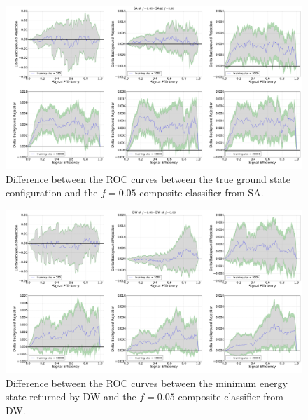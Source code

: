 \begin{figure}[h]
\begin{adjustbox}{center}
\includegraphics[width=\paperwidth]{SA--SA_L5}
\end{adjustbox}
\caption{Difference between the ROC curves between the true ground state configuration and the $f=0.05$ composite classifier from SA.}
\label{fig:SA_GS_SA_L3_droc}
\end{figure}
\clearpage
\begin{figure}[h]
\begin{adjustbox}{center}
\includegraphics[width=\paperwidth]{DW--DW_L5}
\end{adjustbox}
\caption{Difference between the ROC curves between the minimum energy state returned by DW and the $f=0.05$ composite classifier from DW.}
\label{fig:DW_GS_DW_L3_droc}
\end{figure}


% 

 
%  